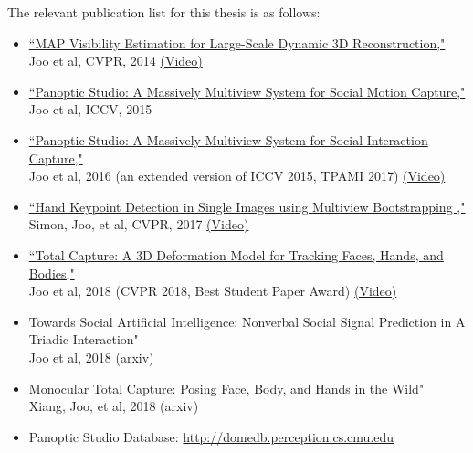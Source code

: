 The relevant publication list for this thesis is as follows: 
\begin{itemize}
	\item  \noindent \href{http://www.cs.cmu.edu/~hanbyulj/14/CVPR_2014_Visibility.pdf}{``MAP Visibility Estimation for Large-Scale Dynamic 3D Reconstruction,"}\\ 
	Joo et al, CVPR, 2014 \href{https://www.youtube.com/watch?v=LaHTjBWago8}{(Video)}
	
	\item \noindent \href{http://www.cs.cmu.edu/~hanbyulj/panoptic-studio/ICCV2015_SMC.pdf}{``Panoptic Studio: A Massively Multiview System for Social Motion Capture,"}\\ 
	Joo et al, ICCV, 2015 
	
	\item \noindent \href{https://ieeexplore.ieee.org/document/8187699}{``Panoptic Studio: A Massively Multiview System for Social Interaction Capture,"}\\ 
	Joo et al, 2016 (an extended version of ICCV 2015, TPAMI 2017) \href{https://www.youtube.com/watch?v=m0-7HnWvxG4}{(Video)}
	
	\item \noindent \href{https://arxiv.org/abs/1704.07809}{``Hand Keypoint Detection in Single Images using Multiview Bootstrapping ,"}\\ 
	Simon, Joo, et al, CVPR, 2017 \href{https://www.youtube.com/watch?v=Lajt6vS_dSM}{(Video)}	
	
	\item \noindent \href{http://openaccess.thecvf.com/content_cvpr_2018/papers/Joo_Total_Capture_A_CVPR_2018_paper.pdf}{``Total Capture: A 3D Deformation Model for Tracking Faces, Hands, and Bodies,"}\\ 
	Joo et al, 2018 (CVPR 2018, Best Student Paper Award) \href{https://www.youtube.com/watch?v=5QzdXQSf-oY}{(Video)}	
	
	\item \noindent 
	{Towards Social Artificial Intelligence: Nonverbal Social Signal Prediction in A Triadic Interaction"}\\ 
	Joo et al, 2018 (arxiv)
	
	\item \noindent 
	{Monocular Total Capture: Posing Face, Body, and Hands in the Wild"}\\ 
	Xiang, Joo, et al, 2018 (arxiv)
	
	\item \noindent Panoptic Studio Database: \url{http://domedb.perception.cs.cmu.edu}
	
	
\end{itemize}



